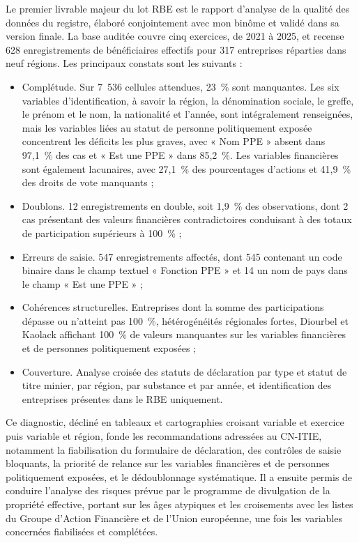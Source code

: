 \documentclass[12pt, a4paper]{article}
\begin{document}
Le premier livrable majeur du lot RBE est le rapport d'analyse de la qualité
des données du registre, élaboré conjointement avec mon binôme et validé dans
sa version finale. La base auditée couvre cinq exercices, de 2021 à 2025, et
recense 628 enregistrements de
bénéficiaires effectifs pour 317 entreprises réparties dans neuf
régions. Les principaux constats sont les suivants :

\begin{itemize}
  \item Complétude. Sur 7~536 cellules attendues, 23~\% sont
  manquantes. Les six variables d'identification, à savoir la région, la
  dénomination sociale, le greffe, le prénom et le nom, la nationalité et
  l'année, sont intégralement renseignées, mais les variables liées au statut
  de personne politiquement exposée concentrent les déficits les plus graves, avec « Nom PPE » absent dans
  97,1~\% des cas et « Est une PPE » dans 85,2~\%. Les variables financières
  sont également lacunaires, avec 27,1~\% des pourcentages d'actions et
  41,9~\% des droits de vote manquants ;
  \item Doublons. 12 enregistrements en double, soit 1,9~\% des
  observations, dont 2 cas présentant des valeurs financières contradictoires
  conduisant à des totaux de participation supérieurs à 100~\% ;
  \item Erreurs de saisie. 547 enregistrements affectés, dont 545
  contenant un code binaire dans le champ textuel « Fonction PPE » et 14 un nom
  de pays dans le champ « Est une PPE » ;
  \item Cohérences structurelles. Entreprises dont la somme des
  participations dépasse ou n'atteint pas 100~\%, hétérogénéités régionales
  fortes, Diourbel et Kaolack affichant 100~\% de valeurs manquantes sur les
  variables financières et de personnes politiquement exposées ;
  \item Couverture. Analyse croisée des statuts de déclaration par
  type et statut de titre minier, par région, par substance et par année, et
  identification des entreprises présentes dans le RBE uniquement.
\end{itemize}

Ce diagnostic, décliné en tableaux et cartographies croisant variable et
exercice puis variable et région, fonde les recommandations
adressées au CN-ITIE, notamment la fiabilisation du formulaire de déclaration,
des contrôles de saisie bloquants, la priorité de relance sur les variables financières et de personnes
politiquement exposées, et le dédoublonnage systématique. Il a ensuite permis de conduire l'analyse des risques prévue par le programme
de divulgation de la propriété effective, portant sur les âges atypiques et
les croisements avec les listes du Groupe d'Action Financière et de l'Union
européenne, une fois les variables concernées fiabilisées et complétées.
\end{document}
